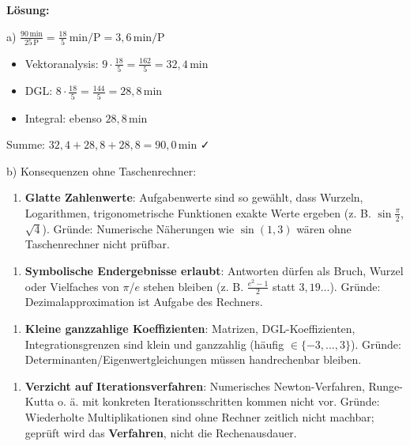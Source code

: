 \documentclass[11pt, a4paper]{article}
\begin{document}
\textbf{Lösung:}


a) $\frac{90\,\text{min}}{25\,\text{P}} = \frac{18}{5}\,\text{min/P} = 3{,}6\,\text{min/P}$


\begin{itemize}
  \item Vektoranalysis: $9 \cdot \frac{18}{5} = \frac{162}{5} = 32{,}4\,\text{min}$
  \item DGL: $8 \cdot \frac{18}{5} = \frac{144}{5} = 28{,}8\,\text{min}$
  \item Integral: ebenso $28{,}8\,\text{min}$
\end{itemize}

Summe: $32{,}4 + 28{,}8 + 28{,}8 = 90{,}0\,\text{min}$ ✓


b) Konsequenzen ohne Taschenrechner:


\begin{enumerate}
  \item \textbf{Glatte Zahlenwerte}: Aufgabenwerte sind so gewählt, dass Wurzeln, Logarithmen, trigonometrische Funktionen exakte Werte ergeben (z. B. $\sin\frac{\pi}{2}$, $\sqrt{4}$). Gründe: Numerische Näherungen wie $\sin(1{,}3)$ wären ohne Taschenrechner nicht prüfbar.
\end{enumerate}

\begin{enumerate}
  \item \textbf{Symbolische Endergebnisse erlaubt}: Antworten dürfen als Bruch, Wurzel oder Vielfaches von $\pi$/$e$ stehen bleiben (z. B. $\frac{e^2 - 1}{2}$ statt $3{,}19...$). Gründe: Dezimalapproximation ist Aufgabe des Rechners.
\end{enumerate}

\begin{enumerate}
  \item \textbf{Kleine ganzzahlige Koeffizienten}: Matrizen, DGL-Koeffizienten, Integrationsgrenzen sind klein und ganzzahlig (häufig $\in \{-3,...,3\}$). Gründe: Determinanten/Eigenwertgleichungen müssen handrechenbar bleiben.
\end{enumerate}

\begin{enumerate}
  \item \textbf{Verzicht auf Iterationsverfahren}: Numerisches Newton-Verfahren, Runge-Kutta o. ä. mit konkreten Iterationsschritten kommen nicht vor. Gründe: Wiederholte Multiplikationen sind ohne Rechner zeitlich nicht machbar; geprüft wird das \textbf{Verfahren}, nicht die Rechenausdauer.
\end{enumerate}
\end{document}
